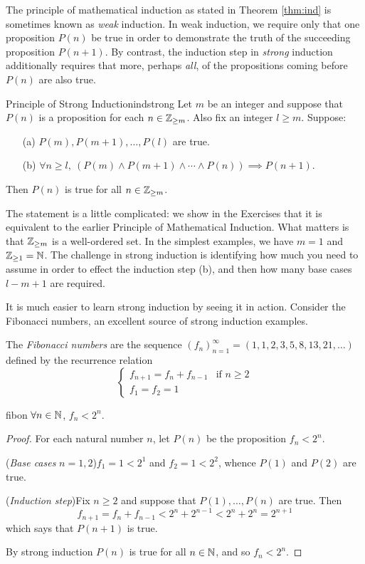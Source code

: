 The principle of mathematical induction as stated in Theorem \ref{thm:ind} is sometimes known as \emph{weak} induction. In weak induction, we require only that one proposition $P(n)$ be true in order to demonstrate the truth of the succeeding proposition $P(n+1)$. By contrast, the induction step in \emph{strong} induction additionally requires that more, perhaps \emph{all}, of the propositions coming before $P(n)$ are also true.

\begin{thm}{Principle of Strong Induction}{indstrong}
	Let $m$ be an integer and suppose that $P(n)$ is a proposition for each $n\in\mathbb{Z}_{\ge m}$. Also fix an integer $l\ge m$. Suppose:
	\begin{enumerate}
	  \item[(a)] $P(m),P(m+1),\ldots,P(l)$ are true.
	  \item[(b)] $\forall n\ge l,\ (P(m)\wedge P(m+1)\wedge\cdots\wedge P(n))\implies P(n+1)$.
	\end{enumerate}
	Then $P(n)$ is true for all $n\in\mathbb{Z}_{\ge m}$.
\end{thm}

The statement is a little complicated: we show in the Exercises that it is equivalent to the earlier Principle of Mathematical Induction. What matters is that $\mathbb{Z}_{\ge m}$ is a well-ordered set. In the simplest examples, we have $m=1$ and $\mathbb{Z}_{\ge 1}=\mathbb{N}$. The challenge in strong induction is identifying how much you need to assume in order to effect the induction step (b), and then how many base cases $l-m+1$ are required.\par
It is much easier to learn strong induction by seeing it in action. Consider the Fibonacci numbers, an excellent source of strong induction examples.

\begin{defn}{}{}
	The \emph{Fibonacci numbers} are the sequence $(f_n)_{n=1}^\infty=(1,1,2,3,5,8,13,21,\ldots)$ defined by the recurrence relation
	\[
		\begin{cases}
			f_{n+1}=f_n+f_{n-1}&\text{if }n\ge 2\\
			f_1=f_2=1&
		\end{cases}
	\]
\end{defn}


\begin{thm}{}{fibon}
	$\forall n\in\mathbb{N}$, $f_n<2^n$.
\end{thm}

\begin{proof}
	For each natural number $n$, let $P(n)$ be the proposition $f_n<2^n$.\par
	(\emph{Base cases} $n=1,2$)\quad $f_1=1<2^1$ and $f_2=1<2^2$, whence $P(1)$ and $P(2)$ are true.\par
	(\emph{Induction step})\quad Fix $n\ge 2$ and suppose that $P(1),\ldots,P(n)$ are true. Then
	\[f_{n+1}=f_n+f_{n-1}<2^n+2^{n-1}<2^n+2^n=2^{n+1}\]
	which says that $P(n+1)$ is true.\par
	By strong induction $P(n)$ is true for all $n\in\mathbb{N}$, and so $f_n<2^n$.
\end{proof}

